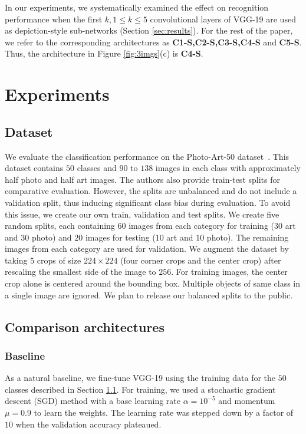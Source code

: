 \documentclass[preprint]{sig-alternate-05-2015}
\begin{document}
In our experiments, we systematically examined the effect on recognition performance when the first $k, 1\le k \le 5$ convolutional layers of VGG-19 are used as depiction-style sub-networks  (Section \ref{sec:results}). For the rest of the paper, we refer to the corresponding architectures as \textbf{C1-S,C2-S,C3-S,C4-S} and \textbf{C5-S}. Thus, the architecture in Figure \ref{fig:3imgs}(c) is \textbf{C4-S}. 

\section{Experiments}
\label{sec:experiments}
 
\subsection{Dataset}
\label{datasets}
    We evaluate the classification performance on the Photo-Art-50 dataset~\cite{cai2015cross}. This dataset contains $50$ classes and $90$ to $138$ images in each class with approximately half photo and half art images. The authors also provide train-test splits for comparative evaluation. However, the splits are unbalanced and do not include a validation split, thus inducing significant class bias during evaluation. To avoid this issue, we  create our own train, validation and test splits. We create five random splits, each containing $60$ images from each category for training ($30$ art and $30$ photo) and $20$ images for testing ($10$ art and $10$ photo). The remaining images from each category are used for validation. We augment the dataset by taking 5 crops of size $224\times 224$ (four corner crops and the center crop) after rescaling the smallest side of the image to $256$. For training images, the center crop alone is centered around the bounding box. Multiple objects of same class in a single image are ignored. We plan to release our balanced splits to the public.  

\subsection{Comparison architectures}
\label{sec:comparisonarch}

\subsubsection{Baseline}
\label{sec:baseline}
As a natural baseline, we fine-tune VGG-19 using the training data for the $50$ classes described in Section \ref{datasets}. For training, we used a stochastic gradient descent (SGD) method with a base learning rate $\alpha=10^{-5}$ and momentum $\mu=0.9$ to learn the weights. The learning rate was stepped down by a factor of $10$ when the validation accuracy plateaued.
\end{document}
